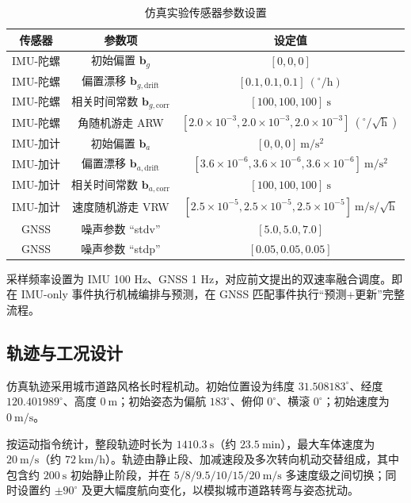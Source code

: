 \begin{table}[htbp]
\centering
\caption{仿真实验传感器参数设置}
\label{tab:ch4_sim_sensor_params}
\begin{tabular}{ccc}
\toprule[1.5pt]
传感器 & 参数项 & 设定值 \\
\midrule[1pt]
IMU-陀螺 & 初始偏置 $\bm{b}_g$ & $[0,0,0]$ \\
IMU-陀螺 & 偏置漂移 $\bm{b}_{g,\text{drift}}$ & $[0.1,0.1,0.1]~(^{\circ}/\mathrm{h})$ \\
IMU-陀螺 & 相关时间常数 $\bm{b}_{g,\text{corr}}$ & $[100,100,100]~\mathrm{s}$ \\
IMU-陀螺 & 角随机游走 ARW & $[2.0\times10^{-3},2.0\times10^{-3},2.0\times10^{-3}]~(^{\circ}/\sqrt{\mathrm{h}})$ \\
\midrule[1pt]
IMU-加计 & 初始偏置 $\bm{b}_a$ & $[0,0,0]~\mathrm{m/s^2}$ \\
IMU-加计 & 偏置漂移 $\bm{b}_{a,\text{drift}}$ & $[3.6\times10^{-6},3.6\times10^{-6},3.6\times10^{-6}]~\mathrm{m/s^2}$ \\
IMU-加计 & 相关时间常数 $\bm{b}_{a,\text{corr}}$ & $[100,100,100]~\mathrm{s}$ \\
IMU-加计 & 速度随机游走 VRW & $[2.5\times10^{-5},2.5\times10^{-5},2.5\times10^{-5}]~\mathrm{m/s}/\sqrt{\mathrm{h}}$ \\
\midrule[1pt]
GNSS & 噪声参数 ``stdv'' & $[5.0,5.0,7.0]$ \\
GNSS & 噪声参数 ``stdp'' & $[0.05,0.05,0.05]$ \\
\bottomrule[1.5pt]
\end{tabular}
\end{table}

采样频率设置为 IMU 100 Hz、GNSS 1 Hz，对应前文提出的双速率融合调度。即在 IMU-only 事件执行机械编排与预测，在 GNSS 匹配事件执行“预测+更新”完整流程。

\subsection{轨迹与工况设计}

仿真轨迹采用城市道路风格长时程机动。初始位置设为纬度 $31.508183^{\circ}$、经度 $120.401989^{\circ}$、高度 $0~\mathrm{m}$；初始姿态为偏航 $183^{\circ}$、俯仰 $0^{\circ}$、横滚 $0^{\circ}$；初始速度为 $0~\mathrm{m/s}$。

按运动指令统计，整段轨迹时长为 $1410.3~\mathrm{s}$（约 $23.5~\mathrm{min}$），最大车体速度为 $20~\mathrm{m/s}$（约 $72~\mathrm{km/h}$）。轨迹由静止段、加减速段及多次转向机动交替组成，其中包含约 $200~\mathrm{s}$ 初始静止阶段，并在 $5/8/9.5/10/15/20~\mathrm{m/s}$ 多速度级之间切换；同时设置约 $\pm90^{\circ}$ 及更大幅度航向变化，以模拟城市道路转弯与姿态扰动。


